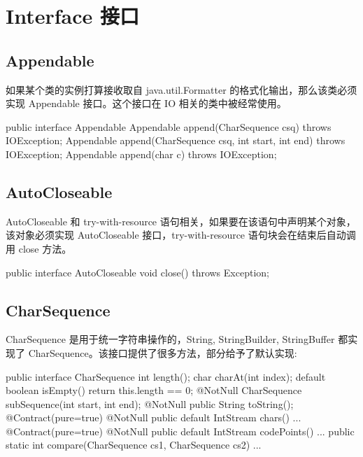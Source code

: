 \section{Interface 接口}

\subsection{Appendable}

如果某个类的实例打算接收取自 java.util.Formatter 的格式化输出，那么该类必须实现 Appendable 接口。这个接口在 IO 相关的类中被经常使用。

\begin{Java}
public interface Appendable {
    Appendable append(CharSequence csq) throws IOException;
    Appendable append(CharSequence csq, int start, int end) throws IOException;
    Appendable append(char c) throws IOException;
}
\end{Java}

\subsection{AutoCloseable}

AutoCloseable 和 try-with-resource 语句相关，如果要在该语句中声明某个对象，该对象必须实现 AutoCloseable 接口，try-with-resource 语句块会在结束后自动调用 close 方法。

\begin{Java}
public interface AutoCloseable {
    void close() throws Exception;
}
\end{Java}

\subsection{CharSequence}

CharSequence 是用于统一字符串操作的，String, StringBuilder, StringBuffer 都实现了 CharSequence。该接口提供了很多方法，部分给予了默认实现:

\begin{Java}
public interface CharSequence {
    int length();
    char charAt(int index);
    default boolean isEmpty() {
        return this.length == 0;
    }
    @NotNull
    CharSequence subSequence(int start, int end);
    @NotNull
    public String toString();
    @Contract(pure=true) @NotNull
    public default IntStream chars() {...}
    @Contract(pure=true) @NotNull
    public default IntStream codePoints() {...}
    public static int compare(CharSequence cs1, CharSequence cs2) {...}
}
\end{Java}

